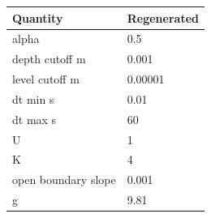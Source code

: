 \begin{tabular}{ll}
Quantity & Regenerated \\
\hline
alpha & 0.5 \\
depth cutoff m & 0.001 \\
level cutoff m & 0.00001 \\
dt min s & 0.01 \\
dt max s & 60 \\
U & 1 \\
K & 4 \\
open boundary slope & 0.001 \\
g & 9.81 \\
\end{tabular}
